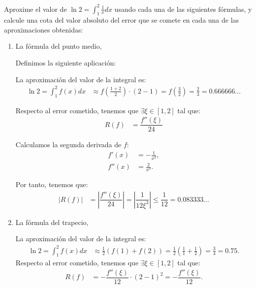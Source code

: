 \begin{ejercicio}\label{ej:2.1.14}
    Aproxime el valor de $\displaystyle \ln 2 = \int_{1}^{2} \frac{1}{x} dx$ usando cada una de las siguientes fórmulas, y calcule una cota del valor absoluto del error que se comete en cada una de las aproximaciones obtenidas:
    \begin{enumerate}
        \item La fórmula del punto medio,
        
        Definimos la siguiente aplicación:

        La aproximación del valor de la integral es:
        \begin{align*}
            \ln 2 = \int_{1}^{2} f(x) dx &\approx f\left(\frac{1 + 2}{2}\right) \cdot (2 - 1) = f\left(\frac{3}{2}\right) = \frac{2}{3} = 0.666666\ldots
        \end{align*}

        Respecto al error cometido, tenemos que $\exists \xi \in [1, 2]$ tal que:
        \begin{align*}
            R(f) &= \dfrac{f''(\xi)}{24}
        \end{align*}

        Calculamos la segunda derivada de $f$:
        \begin{align*}
            f'(x) &= -\frac{1}{x^2},\\
            f''(x) &= \frac{2}{x^3}.
        \end{align*}

        Por tanto, tenemos que:
        \begin{align*}
            |R(f)| &= \left| \dfrac{f''(\xi)}{24} \right| = \left| \dfrac{1}{12\xi^3} \right| \leq \dfrac{1}{12} = 0.083333\ldots
        \end{align*}


        \item La fórmula del trapecio,
        
        La aproximación del valor de la integral es:
        \begin{align*}
            \ln 2 = \int_{1}^{2} f(x) dx &\approx \frac{1}{2} (f(1) + f(2)) = \frac{1}{2} \left(\frac{1}{1} + \frac{1}{2}\right) = \frac{3}{4} = 0.75.
        \end{align*}
        Respecto al error cometido, tenemos que $\exists \xi \in [1, 2]$ tal que:
        \begin{align*}
            R(f) &= -\dfrac{f''(\xi)}{12} \cdot (2 - 1)^2 = -\dfrac{f''(\xi)}{12}.
        \end{align*}


\end{enumerate}
\end{ejercicio}
